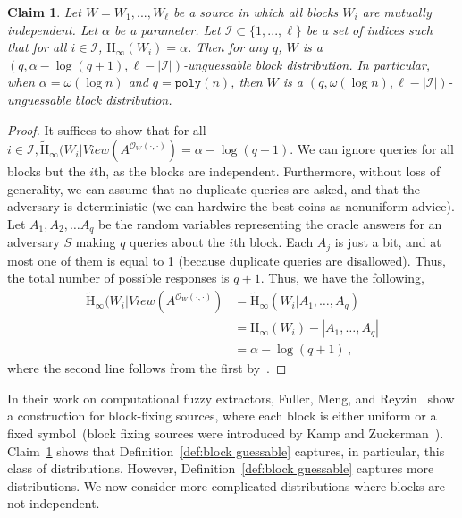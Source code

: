 \documentclass[11pt]{article}
\newcommand{\defref}[1]{\mbox{Definition~\ref{#1}}}
\newcommand{\clref}[1]{\mbox{Claim~\ref{#1}}}
\newcommand{\poly}{\ensuremath{\mathtt{poly}}\xspace}
\newcommand{\Hoo}{\mathrm{H}_\infty}
\newcommand{\Hav}{\tilde{\mathrm{H}}_\infty}
\newtheorem{claim}[theorem]{Claim}
\begin{document}
\begin{claim}
\label{cl:independent high ent}
Let $W = W_1,  ... , W_\ell$ be a source in which all blocks $W_i$  are mutually independent.  Let $\alpha$ be a parameter.  Let $\mathcal{I}\subset \{1,..., \ell\}$ be a set of indices such that for all $i\in\mathcal{I}$, $\Hoo(W_i ) =\alpha $.  Then for any $q$, $W$ is a $(q, \alpha - \log (q+1), \ell - |\mathcal{I}|)$-unguessable block distribution.  In particular, when $\alpha = \omega(\log n)$ and $q = \poly(n)$, then $W$ is a $(q, \omega(\log n), \ell - |\mathcal{I}|)$-unguessable block distribution.
\end{claim}
\begin{proof}
It suffices to show that for all $i\in \mathcal{I}, \Hav(W_i |View(A^{\mathcal{O}_{W}(\cdot, \cdot)}) = \alpha -\log (q+1)$.
We can ignore queries for all blocks but the $i$th, as the blocks are independent. Furthermore, without loss of generality, we can assume that no duplicate queries are asked, and that the adversary is deterministic (we can hardwire the best coins as nonuniform advice). Let $A_1, A_2, \dots A_q$ be the random variables representing the oracle answers for an  adversary $S$ making $q$  queries about the $i$th block. Each $A_j$ is just a bit, and at most one of them  is equal to 1 (because duplicate queries are disallowed). Thus, the total number of possible responses is $q+1$. Thus, we have the following,
\begin{align*}
\Hav(W_i | View(A^{\mathcal{O}_{W}(\cdot, \cdot)}) &= \Hav(W_i| A_1, \dots, A_q)\\
&=\Hoo(W_i) - |A_1, \dots, A_q|\\
&=\alpha - \log (q+1)\,,
\end{align*}
where the second line follows from the first by~\cite[Lemma 2.2]{DBLP:journals/siamcomp/DodisORS08}.
\end{proof}
\noindent In their work on computational fuzzy extractors, Fuller, Meng, and Reyzin~\cite{fuller2013computational} show a construction for block-fixing sources, where each block is either uniform or a fixed symbol~(block fixing sources were introduced by Kamp and Zuckerman~\cite{KZ07}).  \clref{cl:independent high ent} shows that \defref{def:block guessable} captures, in particular, this class of distributions.
However, \defref{def:block guessable} captures more distributions.  We now consider more complicated distributions where blocks are not independent.
\end{document}
